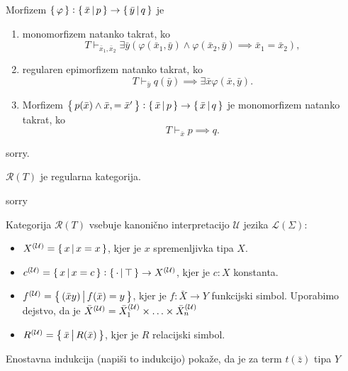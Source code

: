\documentclass[../kategoricna_logika.tex]{subfiles}
\begin{document}
\begin{lema}
  Morfizem $\set{\varphi} : \set{\bar{x}\,\middle|\, p} \to \set{\bar{y}\,\middle|\, q}$ je
  \begin{enumerate}[label=(\roman*)]
    \item monomorfizem natanko takrat, ko
      $$T \vdash_{\bar{x}_1,\bar{x}_2}  \exists \bar{y} \left( \varphi(\bar{x}_1,\bar{y}) \wedge \varphi(\bar{x}_2,\bar{y}) \implies \bar{x}_1 = \bar{x}_2 \right),$$
    \item regularen epimorfizem natanko takrat, ko
      $$T \vdash_{\bar{y}} q(\bar{y}) \implies \exists \bar{x} \varphi(\bar{x},\bar{y}).$$
    \item Morfizem $\set{p(\bar{x}) \wedge \bar{x}, = \bar{x}'} : \set{\bar{x}\,\middle|\, p } \to \set{\bar{x}\,\middle|\, q}$ je monomorfizem natanko takrat, ko
      $$T \vdash_{\bar{x}} p \implies q.$$
  \end{enumerate}
\end{lema}
\begin{dokaz}
  sorry.
\end{dokaz}
\begin{trditev}
  $\mathcal{R}(T)$ je regularna kategorija.
\end{trditev}
\begin{dokaz}
  sorry
\end{dokaz}
\begin{definicija}
  Kategorija $\mathcal{R}(T)$ vsebuje kanonično interpretacijo $\mathcal{U}$ jezika $\mathcal{L}(\Sigma)$:
  \begin{itemize}
    \item $\interp[\mathcal{U}]{X} = \set{x\,\middle|\, x = x}$, kjer je $x$ spremenljivka tipa $X$.
    \item $\interp[\mathcal{U}]{c} = \set{x\,\middle|\, x = c} : \set{\cdot\,\middle|\, \top} \to \interp[\mathcal{U}]{X}$, kjer je $c:X$ konstanta.
    \item $\interp[\mathcal{U}]{f} = \set{(\bar{x}y)\,\middle|\, f(\bar{x}) = y}$,
      kjer je $f : \bar{X}\to Y$ funkcijski simbol. Uporabimo dejstvo, da je $\bar{X}^{(\mathcal{U})} = \interp[\mathcal{U}]{\bar{X}_1} \times \ldots \times \interp[\mathcal{U}]{\bar{X}_n}$
    \item $\interp[\mathcal{U}]{R} = \set{\bar{x}\,\middle|\, R(\bar{x})}$, kjer je $R$ relacijski simbol.
  \end{itemize}
\end{definicija}
\noindent
Enostavna indukcija (napiši to indukcijo) pokaže, da je za term $t(\bar{z})$ tipa $Y$
\end{document}

